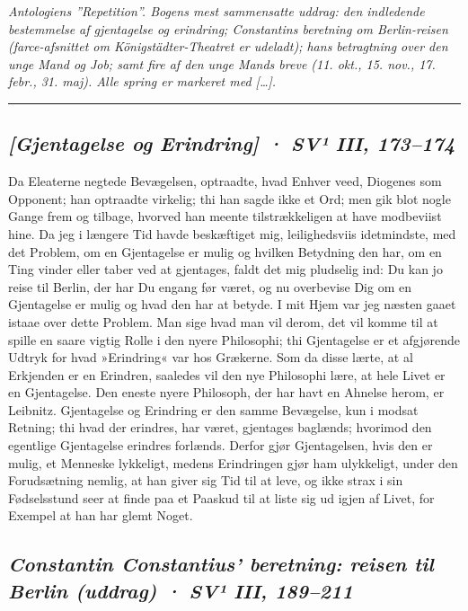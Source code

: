 \documentclass[12pt,a4paper]{article}
\newcommand{\worknote}[1]{{\small\itshape #1\par}\medskip\hrule\bigskip}
\newcommand{\sectionheading}[1]{\subsection*{\normalfont\itshape #1}}
\begin{document}
\worknote{Antologiens ''Repetition''. Bogens mest sammensatte uddrag: den indledende bestemmelse af gjentagelse og erindring; Constantins beretning om Berlin-reisen (farce-afsnittet om Königstädter-Theatret er udeladt); hans betragtning over den unge Mand og Job; samt fire af den unge Mands breve (11. okt., 15. nov., 17. febr., 31. maj). Alle spring er markeret med […].}

\sectionheading{[Gjentagelse og Erindring]  ·  SV¹ III, 173–174}

Da Eleaterne negtede Bevægelsen, optraadte, hvad Enhver veed, Diogenes som Opponent; han optraadte virkelig; thi han sagde ikke et Ord; men gik blot nogle Gange frem og tilbage, hvorved han meente tilstrækkeligen at have modbeviist hine. Da jeg i længere Tid havde beskæftiget mig, leilighedsviis idetmindste, med det Problem, om en Gjentagelse er mulig og hvilken Betydning den har, om en Ting vinder eller taber ved at gjentages, faldt det mig pludselig ind: Du kan jo reise til Berlin, der har Du engang før været, og nu overbevise Dig om en Gjentagelse er mulig og hvad den har at betyde. I mit Hjem var jeg næsten gaaet istaae over dette Problem. Man sige hvad man vil derom, det vil komme til at spille en saare vigtig Rolle i den nyere Philosophi; thi Gjentagelse er et afgjørende Udtryk for hvad »Erindring« var hos Grækerne. Som da disse lærte, at al Erkjenden er en Erindren, saaledes vil den nye Philosophi lære, at hele Livet er en Gjentagelse. Den eneste nyere Philosoph, der har havt en Ahnelse herom, er Leibnitz. Gjentagelse og Erindring er den samme Bevægelse, kun i modsat Retning; thi hvad der erindres, har været, gjentages baglænds; hvorimod den egentlige Gjentagelse erindres forlænds. Derfor gjør Gjentagelsen, hvis den er mulig, et Menneske lykkeligt, medens Erindringen gjør ham ulykkeligt, under den Forudsætning nemlig, at han giver sig Tid til at leve, og ikke strax i sin Fødselsstund seer at finde paa et Paaskud til at liste sig ud igjen af Livet, for Exempel at han har glemt Noget.

\sectionheading{Constantin Constantius' beretning: reisen til Berlin (uddrag)  ·  SV¹ III, 189–211}
\end{document}
